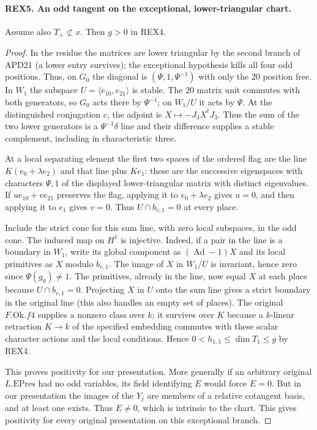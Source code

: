 \paragraph{REX5. An odd tangent on the exceptional, lower-triangular chart.}
\label{claim:REX5}
Assume also \(T_+\not\subset x\). Then \(g>0\) in REX4.
\begin{proof}
In the residue the matrices are lower triangular by the second branch
of APD21 (a lower entry survives); the exceptional hypothesis kills
all four odd positions. Thus, on \(G_0\) the diagonal is
\((\Psi,1,\Psi^{-1})\) with only the \(20\) position free.
In \(W_1\) the subspace \(U=\langle e_{10},e_{21}\rangle\) is stable.
The \(20\) matrix unit commutes with both generators, so \(G_0\)
acts there by \(\Psi^{-1}\); on \(W_1/U\) it acts by \(\Psi\).
At the distinguished conjugation \(c\), the adjoint is
\(X\mapsto-J_3X^tJ_3\). Thus the sum of the two lower generators
is a \(\Psi^{-1}\delta\) line and their difference supplies a
stable complement, including in characteristic three.

At a local separating element the first two spaces of the ordered
flag are the line \(K(e_0+\lambda e_2)\) and that line plus
\(Ke_1\): these are the successive eigenspaces with characters
\(\Psi,1\) of the displayed lower-triangular matrix with distinct
eigenvalues. If \(u e_{10}+v e_{21}\) preserves the flag, applying
it to \(e_0+\lambda e_2\) gives \(u=0\), and then applying it to
\(e_1\) gives \(v=0\). Thus \(U\cap b_{v,1}=0\) at every place.

Include the strict cone for this sum line, with zero local subspaces,
in the odd cone. The induced map on \(H^1\) is injective. Indeed,
if a pair in the line is a boundary in \(W_1\), write its global
component as \((\operatorname{Ad}-1)X\) and its local primitives
as \(X\) modulo \(b_{v,1}\). The image of \(X\) in \(W_1/U\)
is invariant, hence zero since \(\Psi(g_0)\ne1\). The primitives,
already in the line, now equal \(X\) at each place because
\(U\cap b_{v,1}=0\). Projecting \(X\) in \(U\) onto the sum line
gives a strict boundary in the original line (this also handles
an empty set of places). The original \(F.\mathrm{Ok}.f4\) supplies
a nonzero class over \(k\); it survives over \(K\) because a
\(k\)-linear retraction \(K\to k\) of the specified embedding
commutes with these scalar character actions and the local conditions.
Hence \(0<h_{1,1}\le\dim T_1\le g\) by REX4.

This proves positivity for our presentation. More generally if an
arbitrary original \(L.\mathrm{EPres}\) had no odd variables, its
field identifying \(E\) would force \(E=0\). But in our presentation
the images of the \(Y_j\) are members of a relative cotangent basis,
and at least one exists. Thus \(E\ne0\), which is intrinsic to the
chart. This gives positivity for every original presentation on this
exceptional branch.
\end{proof}

